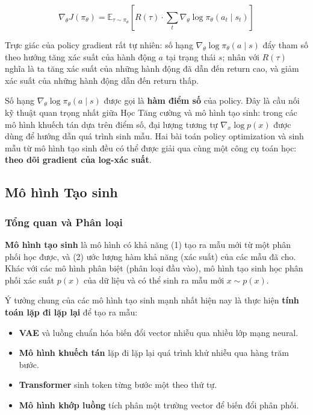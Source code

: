 \begin{equation}
    \nabla_\theta J(\pi_\theta) = \mathbb{E}_{\tau \sim \pi_\theta}
    \left[ R(\tau) \cdot \sum_t \nabla_\theta \log \pi_\theta(a_t \mid
    s_t) \right]
    \label{eq:policy_gradient}
\end{equation}

Trực giác của policy gradient rất tự nhiên: số hạng
$\nabla_\theta \log \pi_\theta(a \mid s)$ đẩy tham số theo hướng tăng
xác suất của hành động $a$ tại trạng thái $s$; nhân với $R(\tau)$
nghĩa là ta tăng xác suất của những hành động đã dẫn đến return cao,
và giảm xác suất của những hành động dẫn đến return thấp.
 
Số hạng $\nabla_\theta \log \pi_\theta(a \mid s)$ được gọi là
\textbf{hàm điểm số} của policy. Đây là cầu nối kỹ thuật quan trọng
nhất giữa Học Tăng cường và mô hình tạo sinh: trong các mô hình khuếch tán dựa trên điểm số,
đại lượng tương tự $\nabla_x \log p(x)$ được dùng để hướng
dẫn quá trình sinh mẫu. Hai bài toán policy optimization và sinh mẫu từ
mô hình tạo sinh đều có thể được giải qua cùng một công cụ toán
học: \textbf{theo dõi gradient của log-xác suất}.

\subsection{Mô hình Tạo sinh}
 
\subsubsection{Tổng quan và Phân loại}
 
\textbf{Mô hình tạo sinh} là mô hình có khả năng (1) tạo ra mẫu mới
từ một phân phối học được, và (2) ước lượng hàm khả năng (xác suất) của
các mẫu đã cho. Khác với các mô hình phân biệt (phân loại đầu vào),
mô hình tạo sinh học phân phối xác suất $p(x)$ của dữ liệu và có thể
sinh ra mẫu mới $x \sim p(x)$.

Ý tưởng chung của các mô hình tạo sinh mạnh nhất hiện nay là thực
hiện \textbf{tính toán lặp đi lặp lại} để tạo ra mẫu:
\begin{itemize}
    \item \textbf{VAE} và luồng chuẩn hóa biến đổi vector nhiễu qua
    nhiều lớp mạng neural.
    \item \textbf{Mô hình khuếch tán} lặp đi lặp lại quá trình khử nhiễu
    qua hàng trăm bước.
    \item \textbf{Transformer} sinh token từng bước một theo thứ tự.
    \item \textbf{Mô hình khớp luồng} tích phân một trường vector để
    biến đổi phân phối.
\end{itemize}

